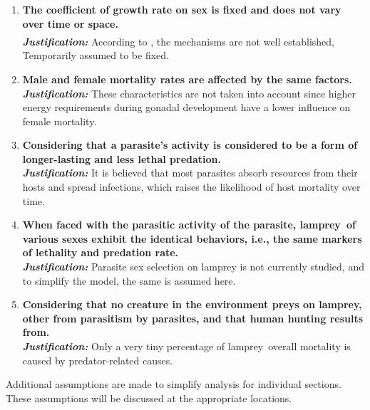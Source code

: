 \documentclass[12pt]{article}  %
\newcommand{\upcite}[1]{\textsuperscript{\textsuperscript{\cite{#1}}}}
\begin{document}
\begin{enumerate}
	\item \textbf{%
	The coefficient of growth rate on sex is fixed and does not vary over time or space.}\\
	\textbf{\textit{Justification: }}%
	According to \upcite{1}, the mechanisms are not well established, Temporarily assumed to be fixed.
	\item \textbf{%
	Male and female mortality rates are affected by the same factors.}\\
	\textbf{\textit{Justification: }}%
	These characteristics are not taken into account since higher energy requirements during gonadal development have a lower influence on female mortality. 
	\item \textbf{%
	Considering that a parasite's activity is considered to be a form of longer-lasting and less lethal predation.}\\
	\textbf{\textit{Justification: }}%
	It is believed that most parasites absorb resources from their hosts and spread infections, which raises the likelihood of host mortality over time.
	\item \textbf{%
	When faced with the parasitic activity of the parasite, lamprey of various sexes exhibit the identical behaviors, i.e., the same markers of lethality and predation rate.}\\
	\textbf{\textit{Justification: }}%
	Parasite sex selection on lamprey is not currently studied, and to simplify the model, the same is assumed here.
	\item \textbf{%
	Considering that no creature in the environment preys on lamprey, other from parasitism by parasites, and that human hunting results from.}\\
	\textbf{\textit{Justification: }}%
	Only a very tiny percentage of lamprey overall mortality is caused by predator-related causes.
	
	
	
\end{enumerate}
Additional assumptions are made to simplify analysis for individual sections. These assumptions will be discussed at the appropriate locations.
\end{document}
